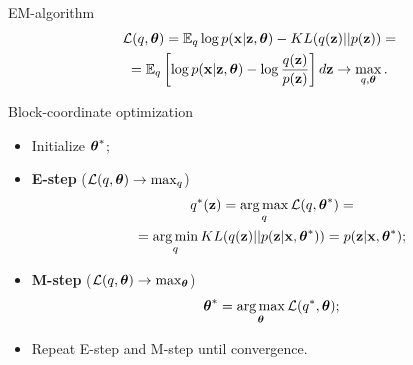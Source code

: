 	\begin{frame}{EM-algorithm}
		\vspace{-0.5cm}
		\begin{multline*}
			\mathcal{L} (q, \boldsymbol{\theta})  =  \mathbb{E}_{q} \log p(\mathbf{x} | \mathbf{z}, \boldsymbol{\theta}) - KL (q(\mathbf{z}) || p(\mathbf{z})) = \\ = \mathbb{E}_q \left[ \log p(\mathbf{x} | \mathbf{z}, \boldsymbol{\theta}) - \log \frac{q(\mathbf{z})}{p(\mathbf{z})} \right]d\mathbf{z} \rightarrow \max_{q, \boldsymbol{\theta}}.
		\end{multline*}
		\vspace{-0.5cm}
		\begin{block}{Block-coordinate optimization}
			\begin{itemize}
				\item Initialize $\boldsymbol{\theta}^*$;
				\item \textbf{E-step} ($\mathcal{L} (q, \boldsymbol{\theta}) \rightarrow \max_q$)
				\vspace{-0.2cm}
				\begin{multline*}
					q^*(\mathbf{z}) = \operatorname*{arg\,max}_q \mathcal{L} (q, \boldsymbol{\theta}^*) = \\
					= \operatorname*{arg\,min}_q KL(q(\mathbf{z}) || p(\mathbf{z} | \mathbf{x}, \boldsymbol{\theta}^*)) = p(\mathbf{z}| \mathbf{x}, \boldsymbol{\theta}^*);
				\end{multline*}
				\item \textbf{M-step} ($\mathcal{L} (q, \boldsymbol{\theta}) \rightarrow \max_{\boldsymbol{\theta}}$)
				\vspace{-0.2cm}
				\[
				\boldsymbol{\theta}^* = \operatorname*{arg\,max}_{\boldsymbol{\theta}} \mathcal{L} (q^*, \boldsymbol{\theta});
				\]
				\vspace{-0.2cm}
				\item Repeat E-step and M-step until convergence.
			\end{itemize}
		\end{block}
	\end{frame}
